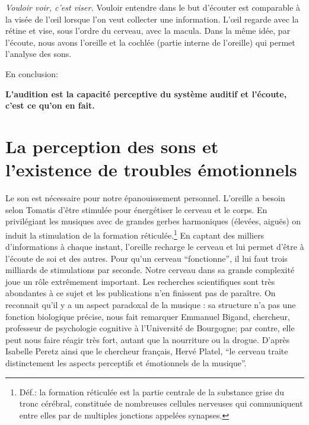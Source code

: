  \emph{Vouloir voir, c'est viser.}  Vouloir entendre dans le but d'écouter est comparable  à
la visée de l'\oe il lorsque l'on veut collecter une
information. L'\oe il regarde avec la rétine et  vise, sous l'ordre du
cerveau, avec la macula. Dans la même idée, par l'écoute, nous avons
l'oreille et la cochlée (partie interne de l'oreille) qui permet
l'analyse des sons.

En conclusion:


 \textbf{ L'audition est la capacité perceptive du système auditif et l'écoute, c'est ce qu'on en fait.}


\section{La perception des sons et l'existence de troubles
  émotionnels}

         Le son est nécessaire pour 
notre
		épanouissement personnel. L'oreille a besoin selon Tomatis d'être stimulée 
pour
		énergétiser le cerveau et le corps. En privilégiant les 
musiques avec
		de grandes gerbes harmoniques (élevées, aiguës) on
                 induit la 
stimulation
		de la formation réticulée.\footnote{Déf.: la formation 
réticulée est la partie centrale de la substance grise du tronc cérébral, 
constituée de nombreuses cellules nerveuses qui communiquent entre elles par de 
multiples jonctions appelées synapses.} En captant des milliers d'informations
		à chaque instant, l'oreille recharge le cerveau et lui permet 
d'être
		à l'écoute de soi et des autres. Pour qu'un cerveau 
``fonctionne'',
		il lui faut trois milliards de stimulations par seconde.
Notre cerveau  dans sa grande complexité joue un rôle extrêmement important.
Les recherches scientifiques sont très abondantes à ce sujet et les publications n'en finissent pas de paraître.
On reconnait qu'il y a un aspect paradoxal de la musique : sa structure n'a pas une 
fonction biologique précise, nous fait remarquer Emmanuel Bigand,  chercheur, professeur 
de psychologie cognitive à l'Université 
de Bourgogne; par contre, elle peut nous faire réagir très fort, autant que la nourriture ou la 
drogue. \autocite[Voir ch. 3 p. 35, "Vous avez l'oreille musicale"]{bigand:cerveau}
D'après Isabelle Peretz
\autocite[<<\,Les agnosies auditives\,>>, pp. 205--216]{seron.baron.ea:neuropsychologie}
ainsi que le chercheur français, Hervé Platel,%
\autocite[pp. 223--224]{platel_neuropsychology_2002}
 \enquote{le cerveau traite distinctement les aspects perceptifs et émotionnels de la 
 musique}.

